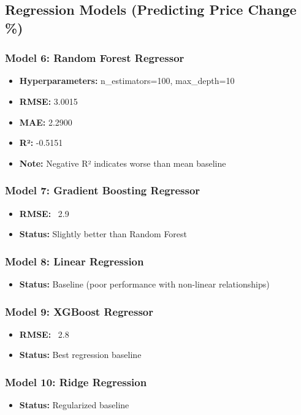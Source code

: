 \subsection{Regression Models (Predicting Price Change \%)}

\subsubsection{Model 6: Random Forest Regressor}
\begin{itemize}
    \item \textbf{Hyperparameters:} n\_estimators=100, max\_depth=10
    \item \textbf{RMSE:} 3.0015
    \item \textbf{MAE:} 2.2900
    \item \textbf{R²:} -0.5151
    \item \textbf{Note:} Negative R² indicates worse than mean baseline
\end{itemize}

\subsubsection{Model 7: Gradient Boosting Regressor}
\begin{itemize}
    \item \textbf{RMSE:} ~2.9
    \item \textbf{Status:} Slightly better than Random Forest
\end{itemize}

\subsubsection{Model 8: Linear Regression}
\begin{itemize}
    \item \textbf{Status:} Baseline (poor performance with non-linear relationships)
\end{itemize}

\subsubsection{Model 9: XGBoost Regressor}
\begin{itemize}
    \item \textbf{RMSE:} ~2.8
    \item \textbf{Status:} Best regression baseline
\end{itemize}

\subsubsection{Model 10: Ridge Regression}
\begin{itemize}
    \item \textbf{Status:} Regularized baseline
\end{itemize}

